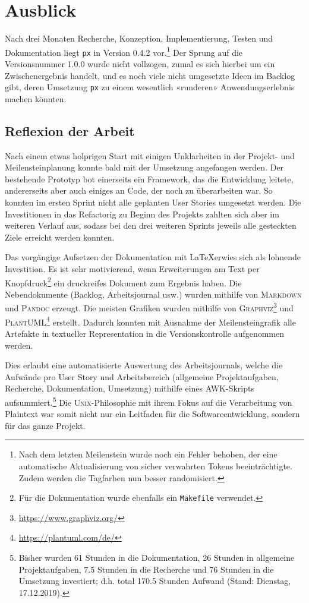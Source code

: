 \section{Ausblick}

Nach drei Monaten Recherche, Konzeption, Implementierung, Testen und Dokumentation liegt \texttt{px} in Version 0.4.2 vor.\footnote{Nach dem letzten Meilenstein wurde noch ein Fehler behoben, der eine automatische Aktualisierung von sicher verwahrten Tokens beeinträchtigte. Zudem werden die Tagfarben nun besser randomisiert.} Der Sprung auf die Versionsnummer 1.0.0 wurde nicht vollzogen, zumal es sich hierbei um ein Zwischenergebnis handelt, und es noch viele nicht umgesetzte Ideen im Backlog gibt, deren Umsetzung \texttt{px} zu einem wesentlich «runderen» Anwendungserlebnis machen könnten.

\subsection{Reflexion der Arbeit}

Nach einem etwas holprigen Start mit einigen Unklarheiten in der Projekt- und Meilensteinplanung konnte bald mit der Umsetzung angefangen werden. Der bestehende Prototyp bot einerseits ein Framework, das die Entwicklung leitete, andererseits aber auch einiges an Code, der noch zu überarbeiten war. So konnten im ersten Sprint nicht alle geplanten User Stories umgesetzt werden. Die Investitionen in das Refactorig zu Beginn des Projekts zahlten sich aber im weiteren Verlauf aus, sodass bei den drei weiteren Sprints jeweils alle gesteckten Ziele erreicht werden konnten.

Das vorgängige Aufsetzen der Dokumentation mit \LaTeX erwies sich als lohnende Investition. Es ist sehr motivierend, wenn Erweiterungen am Text per Knopfdruck\footnote{Für die Dokumentation wurde ebenfalls ein \texttt{Makefile} verwendet.} ein druckreifes Dokument zum Ergebnis haben. Die Nebendokumente (Backlog, Arbeitsjournal usw.) wurden mithilfe von \textsc{Markdown} und \textsc{Pandoc} erzeugt. Die meisten Grafiken wurden mithilfe von \textsc{Graphviz}\footnote{\url{https://www.graphviz.org/}} und \textsc{PlantUML}\footnote{\url{https://plantuml.com/de/}} erstellt. Dadurch konnten mit Ausnahme der Meilensteingrafik alle Artefakte in textueller Representation in die Versionskontrolle aufgenommen werden.

Dies erlaubt eine automatisierte Auswertung des Arbeitsjournals, welche die Aufwände pro User Story und Arbeitsbereich (allgemeine Projektaufgaben, Recherche, Dokumentation, Umsetzung) mithilfe eines \textsc{AWK}-Skripts aufsummiert.\footnote{Bisher wurden 61 Stunden in die Dokumentation, 26 Stunden in allgemeine Projektaufgaben, 7.5 Stunden in die Recherche und 76 Stunden in die Umsetzung investiert; d.h. total 170.5 Stunden Aufwand (Stand: Dienstag, 17.12.2019).} Die \textsc{Unix}-Philoso\-phie mit ihrem Fokus auf die Verarbeitung von Plaintext war somit nicht nur ein Leitfaden für die Softwareentwicklung, sondern für das ganze Projekt.

